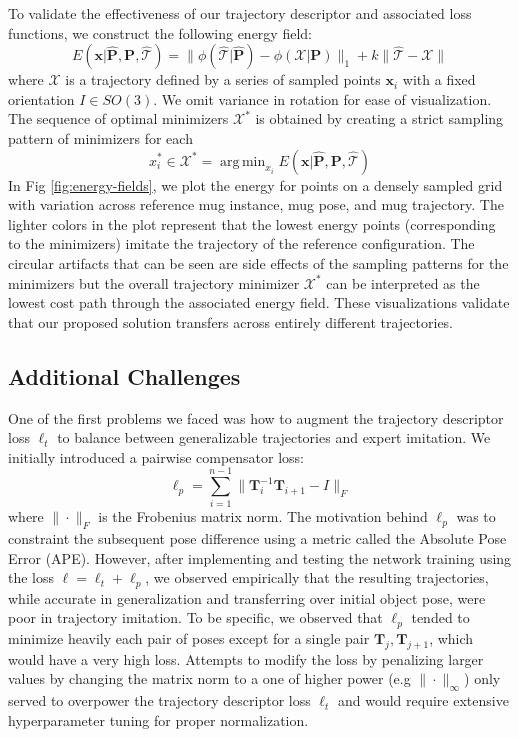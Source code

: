 \documentclass[10pt,twocolumn,letterpaper]{article}
\DeclareMathOperator*{\argmin}{arg\,min}
\begin{document}
To validate the effectiveness of our trajectory descriptor and associated loss functions, we construct the following energy field:
\begin{equation}
    E(\mathbf{x}|\hat{\mathbf{P}},\mathbf{P},\hat{\mathcal{T}}) = \|\phi(\hat{\mathcal{T}}|\hat{\mathbf{P}}) - \phi(\mathcal{X}|\mathbf{P})\|_1 + k\|\hat{\mathcal{T}} - \mathcal{X}\|
    \end{equation}
where $\mathcal{X}$ is a trajectory defined by a series of sampled points $\mathbf{x}_i$ with a fixed orientation $I \in SO(3)$. We omit variance in rotation for ease of visualization. The sequence of optimal minimizers $\mathcal{X}^*$ is obtained by creating a strict sampling pattern of minimizers for each
\begin{equation}
    x^*_i \in \mathcal{X}^* = \argmin_{x_i} E(\mathbf{x}|\hat{\mathbf{P}},\mathbf{P},\hat{\mathcal{T}})
\end{equation}
In Fig \ref{fig:energy-fields}, we plot the energy for points on a densely sampled grid with variation across reference mug instance, mug pose, and mug trajectory. The lighter colors in the plot represent that the lowest energy points (corresponding to the minimizers) imitate the trajectory of the reference configuration. The circular artifacts that can be seen are side effects of the sampling patterns for the minimizers but the overall trajectory minimizer $\mathcal{X}^*$ can be interpreted as the lowest cost path through the associated energy field. These visualizations validate that our proposed solution transfers across entirely different trajectories.

\subsection{Additional Challenges}
\label{challenges}

One of the first problems we faced was how to augment the trajectory descriptor loss $\ell_t$ to balance between generalizable trajectories and expert imitation. We initially introduced a pairwise compensator loss:
\begin{equation}
    \ell_p = \sum_{i = 1}^{n - 1} \|\mathbf{T}^{-1}_i \mathbf{T}_{i + 1} - I\|_{F}
\end{equation}
where $\|\cdot\|_{F}$ is the Frobenius matrix norm. The motivation behind $\ell_p$ was to constraint the subsequent pose difference using a metric called the Absolute Pose Error (APE). However, after implementing and testing the network training using the loss $\ell = \ell_t + \ell_p$, we observed empirically that the resulting trajectories, while accurate in generalization and transferring over initial object pose, were poor in trajectory imitation. To be specific, we observed that $\ell_p$ tended to minimize heavily each pair of poses except for a single pair $\mathbf{T}_j, \mathbf{T}_{j + 1}$, which would have a very high loss. Attempts to modify the loss by penalizing larger values by changing the matrix norm to a one of higher power (e.g $\|\cdot\|_{\infty}$) only served to overpower the trajectory descriptor loss $\ell_t$ and would require extensive hyperparameter tuning for proper normalization.
\end{document}
